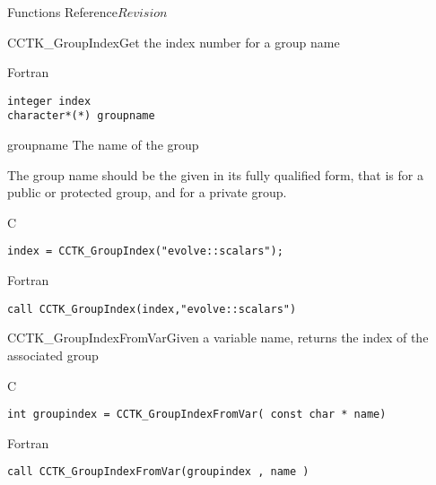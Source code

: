 \begin{cactuspart}{ Functions Reference}{}{$Revision$}
\begin{FunctionDescription}{CCTK\_GroupIndex}{Get the index number for a group name}
\begin{SynopsisSection}
\begin{Synopsis}{Fortran}
\begin{verbatim}
integer index
character*(*) groupname\end{verbatim}
\end{Synopsis}
\end{SynopsisSection}
\begin{ParameterSection}
\begin{Parameter}{groupname}
The name of the group
\end{Parameter}
\end{ParameterSection}
\begin{Discussion}
The group name should be the given in its fully qualified form, that is  for a public or protected group, and  for a private group.
\end{Discussion}
\begin{ExampleSection}
\begin{Example}{C}
\begin{verbatim}
index = CCTK_GroupIndex("evolve::scalars");
\end{verbatim}
\end{Example}
\begin{Example}{Fortran}
\begin{verbatim}
call CCTK_GroupIndex(index,"evolve::scalars")
\end{verbatim}
\end{Example}
\end{ExampleSection}
\end{FunctionDescription}



\begin{FunctionDescription}{CCTK\_GroupIndexFromVar}{Given a variable name, returns the index of the associated group}
\label{CCTK-GroupIndexFromVar}
\begin{SynopsisSection}
\begin{Synopsis}{C}
\begin{verbatim}int groupindex = CCTK_GroupIndexFromVar( const char * name)\end{verbatim}
\end{Synopsis}
\begin{Synopsis}{Fortran}
\begin{verbatim}call CCTK_GroupIndexFromVar(groupindex , name )


\end{verbatim}
\end{Synopsis}
\end{SynopsisSection}
\end{FunctionDescription}
\end{cactuspart}
